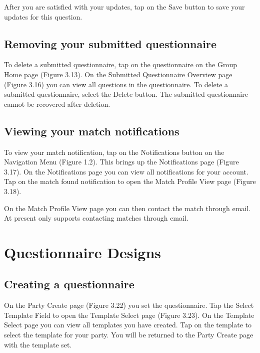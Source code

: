 After you are satisfied with your updates, tap on the Save button to save your updates for this question. 

\subsection{Removing your submitted questionnaire}
\label{sec:questionnaire-submitted-delete}
To delete a submitted questionnaire, tap on the questionnaire on the Group Home page (Figure 3.13). On the Submitted Questionnaire Overview page (Figure 3.16) you can view all questions in the questionnaire.  To delete a submitted questionnaire, select the Delete button.  The submitted questionnaire cannot be recovered after deletion.

\subsection{Viewing your match notifications}
\label{sec:questionnaire-matches}

To view your match notification, tap on the Notifications button on the Navigation Menu (Figure 1.2). This brings up the Notifications page (Figure 3.17).  On the Notifications page you can view all notifications for your account.  Tap on the match found notification to open the Match Profile View page (Figure 3.18).  

On the Match Profile View page you can then contact the match through email.  At present \Friending{} only supports contacting matches through email.


\clearpage
\section{Questionnaire Designs}
\label{sec:admin}

\subsection{Creating a questionnaire}
\label{sec:questionnaire-create}
On the Party Create page (Figure 3.22) you set the questionnaire.  Tap the Select Template Field to open the Template Select page (Figure 3.23).  On the Template Select page you can view all templates you have created.  Tap on the template to select the template for your party.  You will be returned to the Party Create page with the template set.

